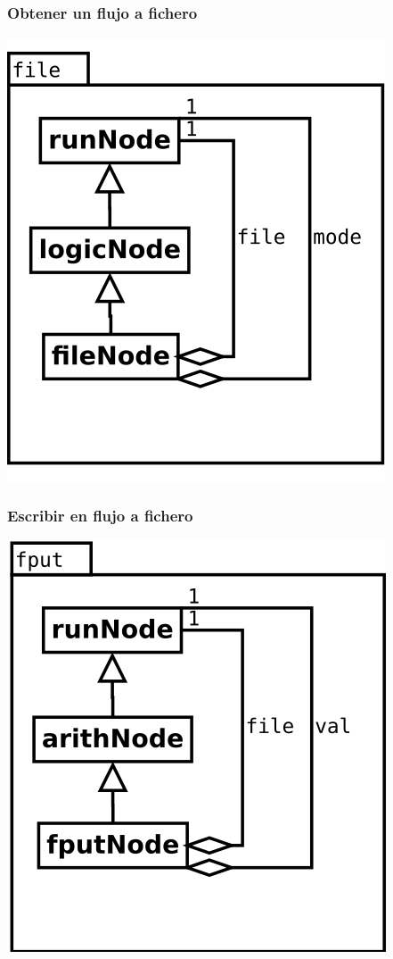 \begin{multicols}{2}
   \subsubsection {Obtener un flujo a fichero} 
   \begin{center}
   \includegraphics[scale=0.4]{file.png} \\
   \end{center}

   \subsubsection {Escribir en flujo a fichero} 
   \begin{center}
   \includegraphics[scale=0.4]{fput.png} \\
   \end{center}


\end{multicols}
